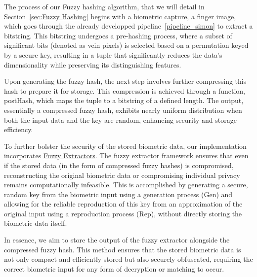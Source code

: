The process of our Fuzzy hashing algorithm, that we will detail in Section~\ref{sec:Fuzzy Hashing}  begins with a biometric capture, a finger image, which goes through the already developped pipeline~\ref{pipeline_simon} to extract a bitstring. This bitstring undergoes a pre-hashing process, where a subset of significant bits (denoted as vein pixels) is selected based on a permutation keyed by a secure key, resulting in a tuple that significantly reduces the data's dimensionality while preserving its distinguishing features.

Upon generating the fuzzy hash, the next step involves further compressing this hash to prepare it for storage. This compression is achieved through a function, postHash, which maps the tuple to a bitstring of a defined length. The output, essentially a compressed fuzzy hash, exhibits nearly uniform distribution when both the input data and the key are random, enhancing security and storage efficiency.

To further bolster the security of the stored biometric data, our implementation incorporates \hyperref[def:Fuzzy_Extractors]{Fuzzy Extractors}. The fuzzy extractor framework ensures that even if the stored data (in the form of compressed fuzzy hashes) is compromised, reconstructing the original biometric data or compromising individual privacy remains computationally infeasible. This is accomplished by generating a secure, random key from the biometric input using a generation process (Gen) and allowing for the reliable reproduction of this key from an approximation of the original input using a reproduction process (Rep), without directly storing the biometric data itself.

In essence, we aim to store the output of the fuzzy extractor alongside the compressed fuzzy hash. This method ensures that the stored biometric data is not only compact and efficiently stored but also securely obfuscated, requiring the correct biometric input for any form of decryption or matching to occur.

